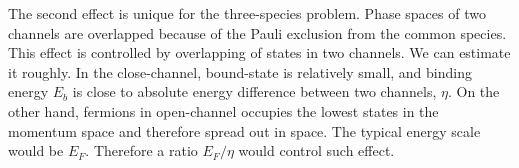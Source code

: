 The second effect is unique for the three-species problem.  Phase spaces of two channels are overlapped because of the Pauli exclusion from the common species. This effect is controlled by overlapping of states in two channels. We can estimate it roughly.  In the close-channel, bound-state is relatively small, and binding energy $E_b$ is close to absolute energy difference between two channels, $\eta$.  On the other hand, fermions in open-channel occupies the lowest states in the momentum space and therefore spread out in space.  The typical energy scale would be $E_F$.  Therefore a ratio $E_F/\eta$ would control such effect. 